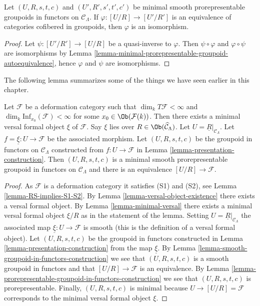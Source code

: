 \begin{lemma}
\label{lemma-minimal-prorepresentable-groupoid-equivalence}
Let $(U, R, s, t, c)$ and $(U', R', s', t', c')$ be minimal smooth
prorepresentable groupoids in functors on $\mathcal{C}_\Lambda$. If
$\varphi : [U/R] \to [U'/R']$ is an equivalence of categories cofibered
in groupoids, then $\varphi$ is an isomorphism.
\end{lemma}

\begin{proof}
Let $\psi : [U'/R'] \to [U/R]$ be a quasi-inverse to $\varphi$.
Then $\psi \circ \varphi$ and $\varphi \circ \psi$ are isomorphisms by
Lemma \ref{lemma-minimal-prorepresentable-groupoid-autoequivalence},
hence $\varphi$ and $\psi$ are isomorphisms.
\end{proof}

\noindent
The following lemma summarizes some of the things we have seen earlier
in this chapter.

\begin{lemma}
\label{lemma-minimal-groupoid-in-functors-construction}
Let $\mathcal{F}$ be a deformation category such that
$\dim_k T\mathcal{F} <\infty$ and
$\dim_k \text{Inf}_{x_0}(\mathcal{F}) < \infty$ for some
$x_0 \in \Ob(\mathcal{F}(k))$.
Then there exists a minimal versal formal object $\xi$ of $\mathcal{F}$.
Say $\xi$ lies over $R \in \Ob(\widehat{\mathcal{C}}_\Lambda)$.
Let $U = \underline{R}|_{\mathcal{C}_\Lambda}$.
Let $f = \underline{\xi} : U \to \mathcal{F}$ be the associated
morphism. Let $(U, R, s, t, c)$ be the groupoid in functors on
$\mathcal{C}_\Lambda$ constructed from $f : U \to \mathcal{F}$ in
Lemma \ref{lemma-presentation-construction}.
Then $(U, R, s, t, c)$ is a minimal smooth prorepresentable
groupoid in functors on $\mathcal{C}_\Lambda$ and there
is an equivalence $[U/R] \to \mathcal{F}$.
\end{lemma}

\begin{proof}
As $\mathcal{F}$ is a deformation category it satisfies (S1) and (S2), see
Lemma \ref{lemma-RS-implies-S1-S2}.
By
Lemma \ref{lemma-versal-object-existence}
there exists a versal formal object. By
Lemma \ref{lemma-minimal-versal}
there exists a minimal versal formal object $\xi/R$ as in the statement
of the lemma. Setting
$U = \underline{R}|_{\mathcal{C}_\Lambda}$ the
associated map $\underline{\xi} : U \to \mathcal{F}$ is smooth (this is
the definition of a versal formal object).
Let $(U, R, s, t, c)$ be the groupoid in functors constructed in
Lemma \ref{lemma-presentation-construction}
from the map $\underline{\xi}$. By
Lemma \ref{lemma-smooth-groupoid-in-functors-construction}
we see that $(U, R, s, t, c)$ is a smooth groupoid in functors and that
$[U/R] \to \mathcal{F}$ is an equivalence. By
Lemma \ref{lemma-prorepresentable-groupoid-in-functors-construction}
we see that $(U, R, s, t, c)$ is prorepresentable.
Finally, $(U, R, s, t, c)$ is minimal because $U \to [U/R] = \mathcal{F}$
corresponds to the minimal versal formal object $\xi$.
\end{proof}

